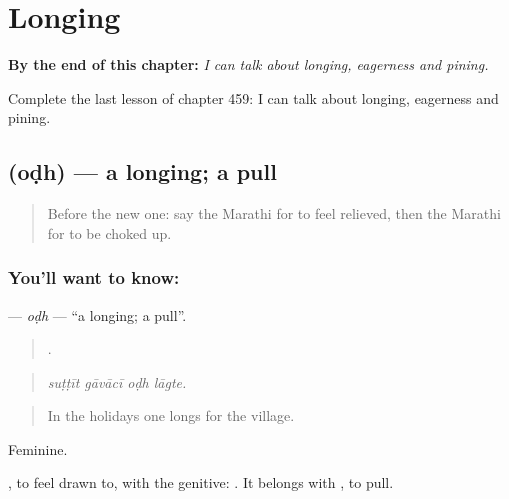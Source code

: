
\chapter{Longing}
\label{ch:mr-longing}

\begin{chapteropening}
\textbf{By the end of this chapter:} \emph{I can talk about longing, eagerness and pining.}

Complete the last lesson of chapter 459: I can talk about longing, eagerness and pining.
\end{chapteropening}

\section[\texorpdfstring{\mr{ओढ} (oḍh)}{ओढ (oḍh)}]{ (oḍh) — a longing; a pull}

\label{lesson:MR-C459-odh}



\begin{quote}
Before the new one: say the Marathi for to feel relieved, then the Marathi for to be choked up.
\end{quote}

\subsection*{You'll want to know: }
\textbf{} — \emph{oḍh} — \textquotedblleft{}a longing; a pull\textquotedblright{}.

\begin{quote}
   .
\end{quote}

\begin{quote}
\emph{suṭṭīt gāvācī oḍh lāgte.}
\end{quote}

\begin{quote}
In the holidays one longs for the village.
\end{quote}

Feminine.

 , to feel drawn to, with the genitive:  . It belongs with , to pull.

